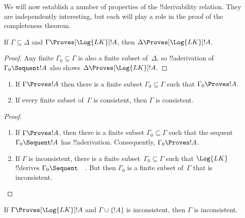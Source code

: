 \documentclass[../../../include/open-logic-section]{subfiles}
\begin{document}

We will now establish a number of properties of the !!{derivability}
relation.  They are independently interesting, but each will play a
role in the proof of the completeness theorem.

\begin{prop}[Monotony]
If $\Gamma \subseteq \Delta$ and $\Gamma \Proves[\Log{LK}] !A$, then $\Delta
\Proves[\Log{LK}] !A$.
\end{prop}

\begin{proof}
Any finite $\Gamma_0 \subseteq \Gamma$ is also a finite subset
of~$\Delta$, so !!a{derivation} of $\Gamma_0 \Sequent !A$ also shows
$\Delta \Proves[\Log{LK}] !A$.
\end{proof}

\begin{prop}[Compactness]
  \begin{enumerate}
  \item If $\Gamma \Proves !A$ then there is a finite subset $\Gamma_0
    \subseteq \Gamma$ such that $\Gamma_0 \Proves !A$.
  \item If every finite subset of~$\Gamma$ is
    consistent, then $\Gamma$ is consistent.
  \end{enumerate}
\end{prop}

\begin{proof}
  \begin{enumerate}
    \item If $\Gamma \Proves !A$, then there is a finite subset
      $\Gamma_0 \subseteq \Gamma$ such that the sequent $\Gamma_0
      \Sequent !A$ has !!a{derivation}. Consequently, $\Gamma_0
      \Proves !A$.
    \item If $\Gamma$ is inconsistent, there is a finite
      subset~$\Gamma_0 \subseteq \Gamma$ such that $\Log{LK}$
      !!{derive}s $\Gamma_0 \Sequent \quad$. But then $\Gamma_0$ is a
      finite subset of~$\Gamma$ that is inconsistent.
  \end{enumerate}
\end{proof}

\begin{prop}
   If $\Gamma \Proves[\Log{LK}] !A$
  and $\Gamma \cup \{!A\}$ is inconsistent, then $\Gamma$
  is inconsistent.
\end{prop}
\end{document}
